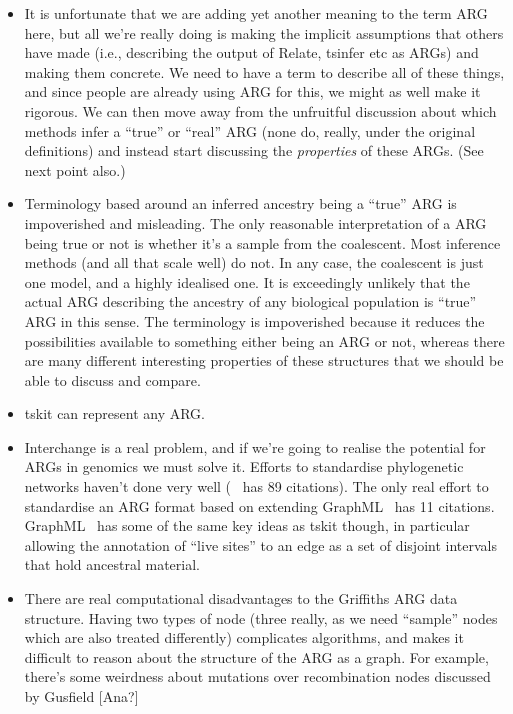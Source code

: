 \documentclass{article}
\begin{document}
\begin{itemize}
\item It is unfortunate that we are adding yet another meaning to the
term ARG here, but all we're really doing is making the implicit
assumptions that others have made (i.e., describing the output of
Relate, tsinfer etc as ARGs) and making them concrete. We need to have a
term to describe all of these things, and since people are already using
ARG for this, we might as well make it rigorous. We can then move away
from the unfruitful discussion about which methods infer a ``true'' or
``real'' ARG (none do, really, under the original definitions) and
instead start discussing the \emph{properties} of these ARGs. (See
next point also.)
\item Terminology based around an inferred ancestry being a ``true''
ARG is impoverished and misleading. The only reasonable interpretation
of a ARG being true or not is whether it's a sample from the coalescent.
Most inference methods (and all that scale well) do not. In any case,
the coalescent is just one model, and a highly idealised one. It is
exceedingly unlikely that the actual ARG describing the ancestry
of any biological population is ``true'' ARG in this sense. The terminology is
impoverished because it reduces the possibilities available
to something either being an ARG or not, whereas there are many different
interesting properties of these structures that we should be able to
discuss and compare.
\item tskit can represent any ARG.
\item Interchange is a real problem, and if we're going to realise the
potential for ARGs in genomics we must solve it. Efforts to standardise
phylogenetic networks haven't done very well (~\citep{cardona2008extended}
has 89 citations). The only real effort to standardise an ARG format
based on extending GraphML~\citep{mcgill2013graphml} has 11 citations.
GraphML~\citep{mcgill2013graphml} has some of the same key ideas
as tskit though, in particular allowing the annotation of ``live sites''
to an edge as a set of disjoint intervals that hold ancestral material.

\item There are real computational disadvantages to the Griffiths ARG
data structure. Having two types of node (three really, as we need
``sample'' nodes which are also treated differently) complicates algorithms,
and makes it difficult to reason about the structure of the ARG as a
graph. For example, there's some weirdness about mutations over
recombination nodes discussed by Gusfield [Ana?]


\end{itemize}
\end{document}
